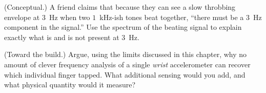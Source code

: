 \begin{exercise}
(Conceptual.) A friend claims that because they can see a slow throbbing
envelope at $3$~Hz when two $1$~kHz-ish tones beat together, ``there must be a
$3$~Hz component in the signal.'' Use the spectrum of the beating signal to explain
exactly what is and is not present at $3$~Hz.
\end{exercise}

\begin{exercise}
(Toward the build.) Argue, using the limits discussed in this chapter, why no
amount of clever frequency analysis of a single \emph{wrist} accelerometer can
recover which individual finger tapped. What additional sensing would you add, and
what physical quantity would it measure?
\end{exercise}
